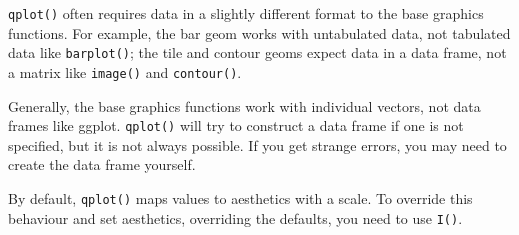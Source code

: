 \texttt{qplot()} often requires data in a slightly different format to
the base graphics functions. For example, the bar geom works with
untabulated data, not tabulated data like \texttt{barplot()}; the tile
and contour geoms expect data in a data frame, not a matrix like
\texttt{image()} and \texttt{contour()}.

\begin{Shaded}
\begin{Highlighting}[]
\NormalTok{(}
 \NormalTok{)}

\NormalTok{(} \NormalTok{, } \NormalTok{)}

  \NormalTok{, } 

  \NormalTok{, } 
\end{Highlighting}
\end{Shaded}

Generally, the base graphics functions work with individual vectors, not
data frames like ggplot. \texttt{qplot()} will try to construct a data
frame if one is not specified, but it is not always possible. If you get
strange errors, you may need to create the data frame yourself.

\begin{Shaded}
\begin{Highlighting}[]
 
\end{Highlighting}
\end{Shaded}

By default, \texttt{qplot()} maps values to aesthetics with a scale. To
override this behaviour and set aesthetics, overriding the defaults, you
need to use \texttt{I()}.

\begin{Shaded}
\begin{Highlighting}[]
 \NormalTok{, } \NormalTok{)}
 \NormalTok{(}\NormalTok{), } \NormalTok{(}\NormalTok{))}
\end{Highlighting}
\end{Shaded}

